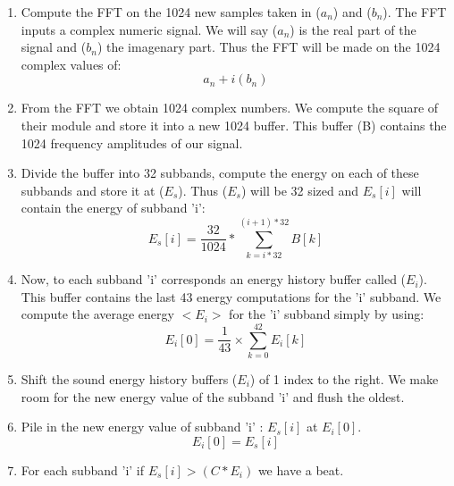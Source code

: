 \begin{enumerate}
        \item Compute the FFT on the 1024 new samples taken in ($a_n$) and ($b_n$). The FFT inputs a complex numeric signal. We will say ($a_n$) is the
                real part of the signal and ($b_n$) the imagenary part. Thus the FFT will be made on the 1024 complex values of: 
                \begin{equation}
                        a_n + i(b_n)
                \end{equation}
        \item From the FFT we obtain 1024 complex numbers. We compute the square of their module and store it into a new 1024 buffer. This buffer (B) contains
                the 1024 frequency amplitudes of our signal.
        \item Divide the buffer into 32 subbands, compute the energy on each of these subbands and store it at ($E_s$). Thus ($E_s$) will be 32 sized
                and $E_s[i]$ will contain the energy of subband 'i': 
                \begin{equation}
                        E_s[i]=\frac{32}{1024}*\sum_{k=i*32}^{(i+1)*32}{B[k]}
                \end{equation}
        \item Now, to each subband 'i' corresponds an energy history buffer called ($E_i$). This buffer contains the last 43 energy computations for
                the 'i' subband. We compute the average energy $<E_i>$ for the 'i' subband simply by using:   
                \begin{equation}
                        E_i[0]=\frac{1}{43}\times\sum_{k=0}^{42}{E_i[k]}
                \end{equation}
        \item Shift the sound energy history buffers ($E_i$) of 1 index to the right. We make room for the new energy value of the subband 'i' and flush the oldest.
        \item Pile in the new energy value of subband 'i' : $E_s[i]$ at $E_i[0]$.   
                \begin{equation}
                        E_i[0]=E_s[i]
                \end{equation}
        \item For each subband 'i' if $E_s[i]>(C*E_i)$ we have a beat.
\end{enumerate}

